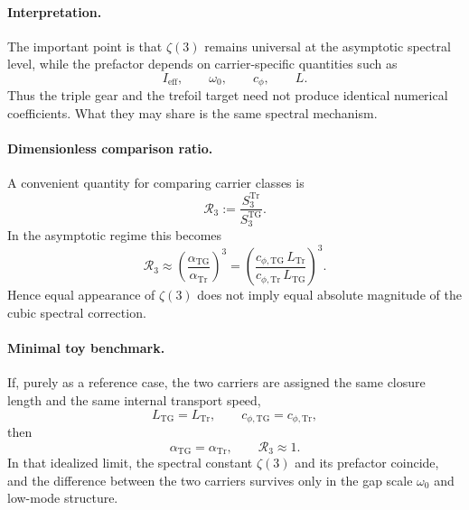 \documentclass[11pt]{article}
\begin{document}
    \paragraph{Interpretation.}
        The important point is that \(\zeta(3)\) remains universal at the asymptotic spectral level,
        while the prefactor depends on carrier-specific quantities such as
        \begin{equation}
            I_{\mathrm{eff}}, \qquad \omega_0, \qquad c_\phi, \qquad L.
        \end{equation}
        Thus the triple gear and the trefoil target need not produce identical numerical coefficients.
        What they may share is the same spectral mechanism.
    
    \paragraph{Dimensionless comparison ratio.}
        A convenient quantity for comparing carrier classes is
        \begin{equation}
            \mathcal{R}_{3}
            :=
            \frac{S_3^{\mathrm{Tr}}}{S_3^{\mathrm{TG}}}.
            \label{eq:R3ratio}
        \end{equation}
        In the asymptotic regime this becomes
        \begin{equation}
            \mathcal{R}_{3}
            \approx
            \left(
                \frac{\alpha_{\mathrm{TG}}}{\alpha_{\mathrm{Tr}}}
            \right)^3
            =
            \left(
                \frac{c_{\phi,\mathrm{TG}}\,L_{\mathrm{Tr}}}
                {c_{\phi,\mathrm{Tr}}\,L_{\mathrm{TG}}}
            \right)^3.
            \label{eq:R3ratio_asymptotic}
        \end{equation}
        Hence equal appearance of \(\zeta(3)\) does not imply equal absolute magnitude of the cubic
        spectral correction.
    
    \paragraph{Minimal toy benchmark.}
        If, purely as a reference case, the two carriers are assigned the same closure length and the same
        internal transport speed,
        \begin{equation}
            L_{\mathrm{TG}} = L_{\mathrm{Tr}},
            \qquad
            c_{\phi,\mathrm{TG}} = c_{\phi,\mathrm{Tr}},
        \end{equation}
        then
        \begin{equation}
            \alpha_{\mathrm{TG}}=\alpha_{\mathrm{Tr}},
            \qquad
            \mathcal{R}_{3}\approx 1.
        \end{equation}
        In that idealized limit, the spectral constant \(\zeta(3)\) and its prefactor coincide, and the
        difference between the two carriers survives only in the gap scale \(\omega_0\) and low-mode structure.
    
\end{document}
